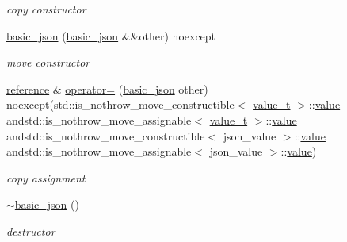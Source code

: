 \begin{DoxyCompactItemize}
\begin{DoxyCompactList}\small\item\em copy constructor \end{DoxyCompactList}\item 
\hyperlink{classnlohmann_1_1basic__json_a9a06d1efd50a00f4889f831f851ce124}{basic\+\_\+json} (\hyperlink{classnlohmann_1_1basic__json}{basic\+\_\+json} \&\&other) noexcept
\begin{DoxyCompactList}\small\item\em move constructor \end{DoxyCompactList}\item 
\hyperlink{classnlohmann_1_1basic__json_ac6a5eddd156c776ac75ff54cfe54a5bc}{reference} \& \hyperlink{classnlohmann_1_1basic__json_a175607715d6c65e8901038ebb629a5b9}{operator=} (\hyperlink{classnlohmann_1_1basic__json}{basic\+\_\+json} other) noexcept(std\+::is\+\_\+nothrow\+\_\+move\+\_\+constructible$<$ \hyperlink{namespacenlohmann_1_1detail_a90aa5ef615aa8305e9ea20d8a947980f}{value\+\_\+t} $>$\+::\hyperlink{classnlohmann_1_1basic__json_a9fa223b26419f018f9b18cc516e3a8e5}{value} andstd\+::is\+\_\+nothrow\+\_\+move\+\_\+assignable$<$ \hyperlink{namespacenlohmann_1_1detail_a90aa5ef615aa8305e9ea20d8a947980f}{value\+\_\+t} $>$\+::\hyperlink{classnlohmann_1_1basic__json_a9fa223b26419f018f9b18cc516e3a8e5}{value} andstd\+::is\+\_\+nothrow\+\_\+move\+\_\+constructible$<$ json\+\_\+value $>$\+::\hyperlink{classnlohmann_1_1basic__json_a9fa223b26419f018f9b18cc516e3a8e5}{value} andstd\+::is\+\_\+nothrow\+\_\+move\+\_\+assignable$<$ json\+\_\+value $>$\+::\hyperlink{classnlohmann_1_1basic__json_a9fa223b26419f018f9b18cc516e3a8e5}{value})
\begin{DoxyCompactList}\small\item\em copy assignment \end{DoxyCompactList}\item 
\hyperlink{classnlohmann_1_1basic__json_a42347bbce75ba5571e292a3540af30e0}{$\sim$basic\+\_\+json} ()
\begin{DoxyCompactList}\small\item\em destructor \end{DoxyCompactList}\end{DoxyCompactItemize}
